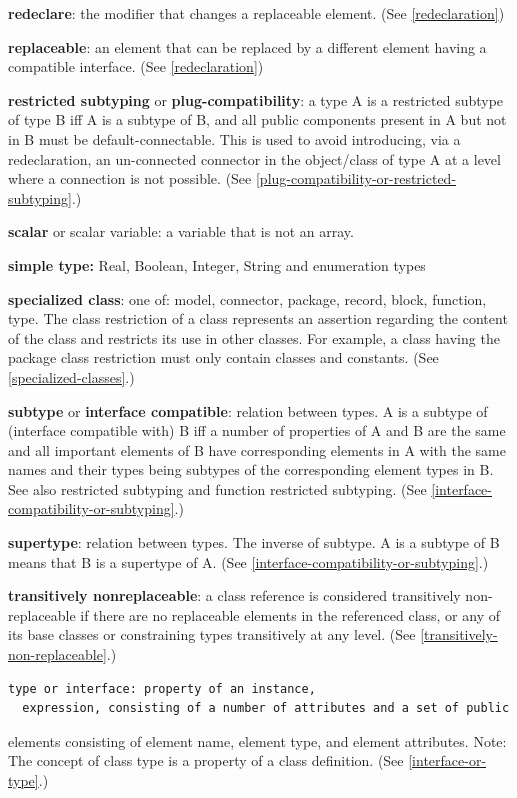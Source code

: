 \documentclass[10pt,a4paper]{report}
\begin{document}
\textbf{redeclare}: the modifier that changes a replaceable element.
(See \ref{redeclaration})

\textbf{replaceable}: an element that can be replaced by a different
element having a compatible interface. (See \ref{redeclaration})

\textbf{restricted subtyping} or \textbf{plug-compatibility}: a type A
is a restricted subtype of type B iff A is a subtype of B, and all
public components present in A but not in B must be default-connectable.
This is used to avoid introducing, via a redeclaration, an un-connected
connector in the object/class of type A at a level where a connection is
not possible. (See \ref{plug-compatibility-or-restricted-subtyping}.)

\textbf{scalar} or scalar variable: a variable that is not an array.

\textbf{simple type:} Real, Boolean, Integer, String and enumeration
types

\textbf{specialized class}: one of: model, connector, package, record,
block, function, type. The class restriction of a class represents an
assertion regarding the content of the class and restricts its use in
other classes. For example, a class having the package class restriction
must only contain classes and constants. (See \ref{specialized-classes}.)

\textbf{subtype} or \textbf{interface compatible}: relation between
types. A is a subtype of (interface compatible with) B iff a number of
properties of A and B are the same and all important elements of B have
corresponding elements in A with the same names and their types being
subtypes of the corresponding element types in B. See also restricted
subtyping and function restricted subtyping. (See \ref{interface-compatibility-or-subtyping}.)

\textbf{supertype}: relation between types. The inverse of subtype. A is
a subtype of B means that B is a supertype of A. (See \ref{interface-compatibility-or-subtyping}.)

\textbf{transitively nonreplaceable}: a class reference is considered
transitively non-replaceable if there are no replaceable elements in the
referenced class, or any of its base classes or constraining types
transitively at any level. (See \ref{transitively-non-replaceable}.)

\begin{lstlisting}[language=modelica]
type or interface: property of an instance,
  expression, consisting of a number of attributes and a set of public
\end{lstlisting}
elements consisting of element name, element type, and element
attributes. Note: The concept of class type is a property of a class
definition. (See \ref{interface-or-type}.)
\end{document}
